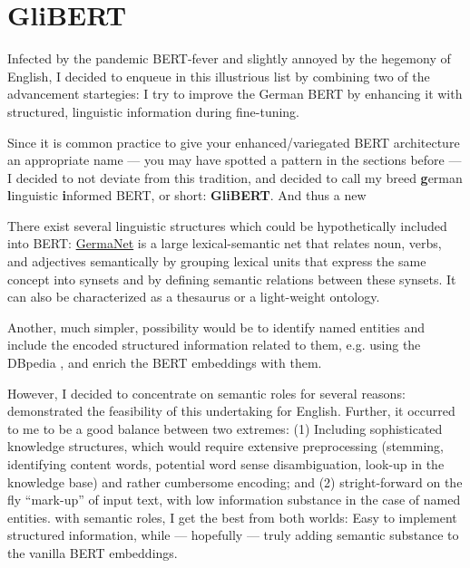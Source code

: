 \section{GliBERT}

Infected by the pandemic BERT-fever and slightly annoyed by the hegemony of English, I decided to
enqueue in this illustrious list by combining two of the {\color{red} advancement startegies}: I try to improve
the German BERT by enhancing it with structured, linguistic information during fine-tuning.

Since it is common practice to give your enhanced/variegated BERT architecture an appropriate name --- you may have spotted
a pattern in the sections before --- I decided to not deviate from this tradition, and decided to call my breed
\textbf{g}erman \textbf{l}inguistic \textbf{i}nformed BERT, or short: \textbf{GliBERT}.
And thus a new

There exist several linguistic structures which could be hypothetically included into BERT:
\href{https://uni-tuebingen.de/en/faculties/faculty-of-humanities/departments/modern-languages/department-of-linguistics/chairs/general-and-computational-linguistics/ressources/lexica/germanet/}{GermaNet} \citep{hamp1997germanet}
is a large lexical-semantic net that relates noun, verbs, and adjectives semantically by
grouping lexical units that express the same concept into synsets and by defining semantic
relations between these synsets. It can also be characterized as a thesaurus or a light-weight
ontology.

Another, much simpler, possibility would be to identify named entities
and include the encoded structured
information related to them, e.g. using the DBpedia \citep{auer2007dbpedia}, and enrich
the BERT embeddings with them.

However, I decided to concentrate on semantic roles for several reasons: \citeauthor{zhang2019semantics}
demonstrated the feasibility of this undertaking for English. Further, it occurred to me to be a good
balance between two extremes: (1) Including sophisticated knowledge structures, which would
require extensive preprocessing (stemming, identifying content words, potential word sense
disambiguation, look-up in the knowledge base) and rather cumbersome encoding; and (2)
stright-forward on the fly ``mark-up'' of input text, with low information substance in the
case of named entities. with semantic roles, I get the best from both worlds: Easy to implement
structured information, while --- hopefully --- truly adding semantic substance to the vanilla
BERT embeddings.



